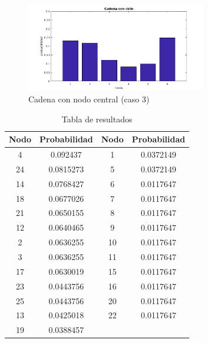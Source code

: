 \begin{figure}[H]
  \centering
    \includegraphics[width=0.7\textwidth]{img/cadena6v3.png}
  \caption{Cadena con nodo central (caso 3)}
  \label{fig: Cadena con nodo central, con ciclo}
\end{figure}

\begin{table}[H]
\centering
	\begin{tabular}{|c|c|c|c|}
		\hline
		Nodo & Probabilidad & Nodo & Probabilidad \\ \hline
		4    & 0.092437     & 1    & 0.0372149    \\
		24   & 0.0815273    & 5    & 0.0372149    \\
		14   & 0.0768427    & 6    & 0.0117647    \\
		18   & 0.0677026    & 7    & 0.0117647    \\
		21   & 0.0650155    & 8    & 0.0117647    \\
		12   & 0.0640465    & 9    & 0.0117647    \\
		2    & 0.0636255    & 10   & 0.0117647    \\
		3    & 0.0636255    & 11   & 0.0117647    \\
		17   & 0.0630019    & 15   & 0.0117647    \\
		23   & 0.0443756    & 16   & 0.0117647    \\
		25   & 0.0443756    & 20   & 0.0117647    \\
		13   & 0.0425018    & 22   & 0.0117647    \\
		19   & 0.0388457    & ~    & ~            \\ \hline
	\end{tabular}
\caption {Tabla de resultados}
\end{table}

